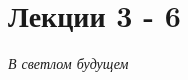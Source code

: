 


    \newpage
    \hypertarget{intro}{}
    \tableofcontents
    \newpage
    
    
    
    
    
    \section{Лекции 3 - 6}
    \textit{В светлом будущем}
        
    
    \newpage
    
